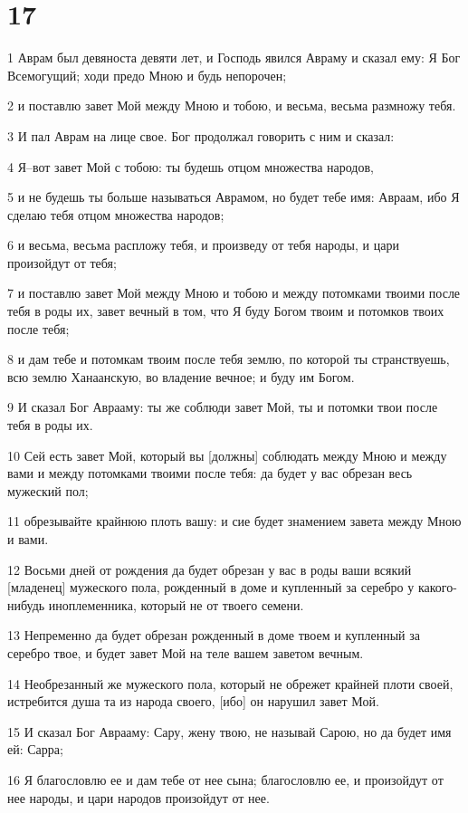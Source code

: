 \chapter{17}

\par 1 Аврам был девяноста девяти лет, и Господь явился Авраму и сказал ему: Я Бог Всемогущий; ходи предо Мною и будь непорочен;
\par 2 и поставлю завет Мой между Мною и тобою, и весьма, весьма размножу тебя.
\par 3 И пал Аврам на лице свое. Бог продолжал говорить с ним и сказал:
\par 4 Я--вот завет Мой с тобою: ты будешь отцом множества народов,
\par 5 и не будешь ты больше называться Аврамом, но будет тебе имя: Авраам, ибо Я сделаю тебя отцом множества народов;
\par 6 и весьма, весьма распложу тебя, и произведу от тебя народы, и цари произойдут от тебя;
\par 7 и поставлю завет Мой между Мною и тобою и между потомками твоими после тебя в роды их, завет вечный в том, что Я буду Богом твоим и потомков твоих после тебя;
\par 8 и дам тебе и потомкам твоим после тебя землю, по которой ты странствуешь, всю землю Ханаанскую, во владение вечное; и буду им Богом.
\par 9 И сказал Бог Аврааму: ты же соблюди завет Мой, ты и потомки твои после тебя в роды их.
\par 10 Сей есть завет Мой, который вы [должны] соблюдать между Мною и между вами и между потомками твоими после тебя: да будет у вас обрезан весь мужеский пол;
\par 11 обрезывайте крайнюю плоть вашу: и сие будет знамением завета между Мною и вами.
\par 12 Восьми дней от рождения да будет обрезан у вас в роды ваши всякий [младенец] мужеского пола, рожденный в доме и купленный за серебро у какого-нибудь иноплеменника, который не от твоего семени.
\par 13 Непременно да будет обрезан рожденный в доме твоем и купленный за серебро твое, и будет завет Мой на теле вашем заветом вечным.
\par 14 Необрезанный же мужеского пола, который не обрежет крайней плоти своей, истребится душа та из народа своего, [ибо] он нарушил завет Мой.
\par 15 И сказал Бог Аврааму: Сару, жену твою, не называй Сарою, но да будет имя ей: Сарра;
\par 16 Я благословлю ее и дам тебе от нее сына; благословлю ее, и произойдут от нее народы, и цари народов произойдут от нее.
